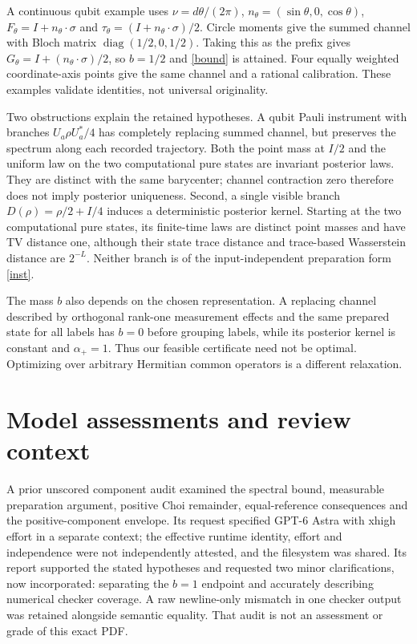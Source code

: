 \documentclass[11pt]{article}
\begin{document}
A continuous qubit example uses $\nu=d\theta/(2\pi)$,
$n_\theta=(\sin\theta,0,\cos\theta)$,
$F_\theta=I+n_\theta\cdot\sigma$ and
$\tau_\theta=(I+n_\theta\cdot\sigma)/2$.
Circle moments give the summed channel with Bloch matrix
$\operatorname{diag}(1/2,0,1/2)$.
Taking this as the prefix gives
$G_\theta=I+(n_\theta\cdot\sigma)/2$, so $b=1/2$ and \eqref{bound} is attained. Four equally weighted coordinate-axis points give the same channel and a rational calibration. These examples validate identities, not universal originality.

Two obstructions explain the retained hypotheses. A qubit Pauli instrument with branches $U_a\rho U_a^*/4$ has completely replacing summed channel, but preserves the spectrum along each recorded trajectory. Both the point mass at $I/2$ and the uniform law on the two computational pure states are invariant posterior laws. They are distinct with the same barycenter; channel contraction zero therefore does not imply posterior uniqueness. Second, a single visible branch $D(\rho)=\rho/2+I/4$ induces a deterministic posterior kernel. Starting at the two computational pure states, its finite-time laws are distinct point masses and have TV distance one, although their state trace distance and trace-based Wasserstein distance are $2^{-L}$. Neither branch is of the input-independent preparation form \eqref{inst}.

The mass $b$ also depends on the chosen representation. A replacing channel described by orthogonal rank-one measurement effects and the same prepared state for all labels has $b=0$ before grouping labels, while its posterior kernel is constant and $\alpha_+=1$. Thus our feasible certificate need not be optimal. Optimizing over arbitrary Hermitian common operators is a different relaxation.

\section*{Model assessments and review context}
A prior unscored component audit examined the spectral bound, measurable preparation argument, positive Choi remainder, equal-reference consequences and the positive-component envelope. Its request specified GPT-6 Astra with xhigh effort in a separate context; the effective runtime identity, effort and independence were not independently attested, and the filesystem was shared. Its report supported the stated hypotheses and requested two minor clarifications, now incorporated: separating the $b=1$ endpoint and accurately describing numerical checker coverage. A raw newline-only mismatch in one checker output was retained alongside semantic equality. That audit is not an assessment or grade of this exact PDF.
\end{document}
